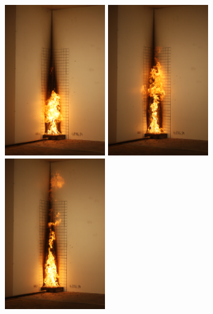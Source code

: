 \documentclass[twoside]{uocthesis}
\begin{document}
{\begin{figure}[p]
	\includegraphics[width=1.7in]{../Figures/GBNG34_SequenceIMG_0993}
	\includegraphics[width=1.7in]{../Figures/GBNG34_SequenceIMG_0994} 
	\includegraphics[width=1.7in]{../Figures/GBNG34_SequenceIMG_0995} \\


\end{figure}}
\end{document}
